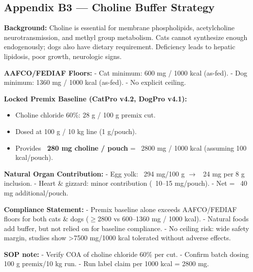 \subsection*{Appendix B3 --- Choline Buffer Strategy}

\textbf{Background:}  
Choline is essential for membrane phospholipids, acetylcholine neurotransmission, and methyl group metabolism. Cats cannot synthesize enough endogenously; dogs also have dietary requirement. Deficiency leads to hepatic lipidosis, poor growth, neurologic signs.  

\textbf{AAFCO/FEDIAF Floors:}  
- Cat minimum: 600 mg / 1000 kcal (as-fed).  
- Dog minimum: 1360 mg / 1000 kcal (as-fed).  
- No explicit ceiling.  

\textbf{Locked Premix Baseline (CatPro v4.2, DogPro v4.1):}  
\begin{itemize}[leftmargin=1.2em]
  \item Choline chloride 60\%: 28 g / 100 g premix cut.  
  \item Dosed at 100 g / 10 kg line (1 g/pouch).  
  \item Provides \textbf{~280 mg choline / pouch} = ~2800 mg / 1000 kcal (assuming 100 kcal/pouch).  
\end{itemize}

\textbf{Natural Organ Contribution:}  
- Egg yolk: ~294 mg/100 g $\rightarrow$ ~24 mg per 8 g inclusion.  
- Heart \& gizzard: minor contribution (~10--15 mg/pouch).  
- Net = ~40 mg additional/pouch.  

\textbf{Compliance Statement:}  
- Premix baseline alone exceeds AAFCO/FEDIAF floors for both cats \& dogs ($\geq$2800 vs 600--1360 mg / 1000 kcal).  
- Natural foods add buffer, but not relied on for baseline compliance.  
- No ceiling risk: wide safety margin, studies show >7500 mg/1000 kcal tolerated without adverse effects.  

\textbf{SOP note:}  
- Verify COA of choline chloride 60\% per cut.  
- Confirm batch dosing 100 g premix/10 kg run.  
- Run label claim per 1000 kcal = 2800 mg.  

